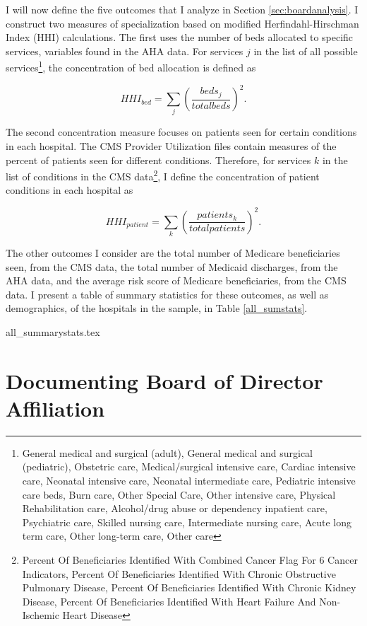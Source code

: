 \documentclass[12pt]{article}
\begin{document}
    I will now define the five outcomes that I analyze in Section \ref{sec:boardanalysis}. I construct two measures of specialization based on modified Herfindahl-Hirschman Index (HHI) calculations. The first uses the number of beds allocated to specific services, variables found in the AHA data. For services $j$ in the list of all possible services\footnote{General medical and surgical (adult), General medical and surgical (pediatric), Obstetric care, Medical/surgical intensive care, Cardiac intensive care, Neonatal intensive care, Neonatal intermediate care, Pediatric intensive care beds, Burn care, Other Special Care, Other intensive care, Physical Rehabilitation care, Alcohol/drug abuse or dependency inpatient care, Psychiatric care, Skilled nursing care, Intermediate nursing care, Acute long term care, Other long-term care, Other care}, the concentration of bed allocation is defined as 

    $$HHI_{bed} = \sum_{j}\left(\frac{beds_j}{total beds}\right)^2.$$

    The second concentration measure focuses on patients seen for certain conditions in each hospital. The CMS Provider Utilization files contain measures of the percent of patients seen for different conditions. Therefore, for services $k$ in the list of conditions in the CMS data\footnote{Percent Of Beneficiaries Identified With Combined Cancer Flag For 6 Cancer Indicators, Percent Of Beneficiaries Identified With Chronic Obstructive Pulmonary Disease, Percent Of Beneficiaries Identified With Chronic Kidney Disease, Percent Of Beneficiaries Identified With Heart Failure And Non-Ischemic Heart Disease}, I define the concentration of patient conditions in each hospital as 

    $$HHI_{patient} = \sum_{k}\left(\frac{patients_k}{total patients}\right)^2.$$

    The other outcomes I consider are the total number of Medicare beneficiaries seen, from the CMS data, the total number of Medicaid discharges, from the AHA data, and the average risk score of Medicare beneficiaries, from the CMS data. I present a table of summary statistics for these outcomes, as well as demographics, of the hospitals in the sample, in Table \ref{all_sumstats}. 

    {all_summarystats.tex}
    


    \section{Documenting Board of Director Affiliation}
\end{document}
